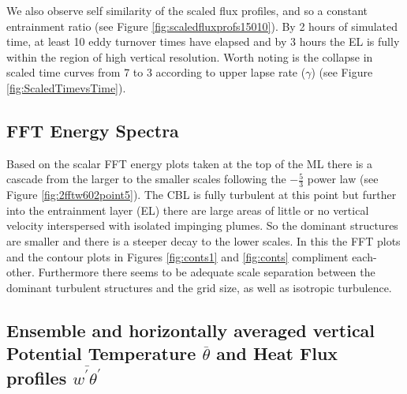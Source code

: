 We also observe self similarity of the scaled flux profiles, and so a constant entrainment ratio (see Figure \ref{fig:scaledfluxprofs15010}). By 2 hours of simulated time, at least 10 eddy turnover times have elapsed and by 3 hours the \acs{EL} is fully within the region of high vertical resolution.  Worth noting is the collapse in scaled time curves from 7 to 3 according to upper lapse rate ($\gamma$) (see Figure \ref{fig:ScaledTimevsTime}).

\subsection{FFT Energy Spectra}
\FloatBarrier

Based on the scalar \acs{FFT} energy plots taken at the top of the \acs{ML} there is a cascade from the larger
to the smaller scales following the $-\frac{5}{3}$ power law (see Figure \ref{fig:2fftw602point5}). The \acs{CBL} is fully turbulent at this point
but further into the entrainment layer (\acs{EL}) there are large areas of little or no vertical velocity
interspersed with isolated impinging plumes.  So the dominant structures are smaller
and there is a steeper decay to the lower scales.  In this the \acs{FFT} plots and the contour plots in Figures \ref{fig:conts1} and \ref{fig:conts} compliment
each-other.  Furthermore there seems to be adequate scale separation between the dominant turbulent structures and the grid size, as well as isotropic turbulence.


\subsection{Ensemble and horizontally averaged vertical Potential Temperature $\overline{\theta}$ 
and Heat Flux profiles $\overline{w^{'}\theta^{'}}$}
\FloatBarrier

